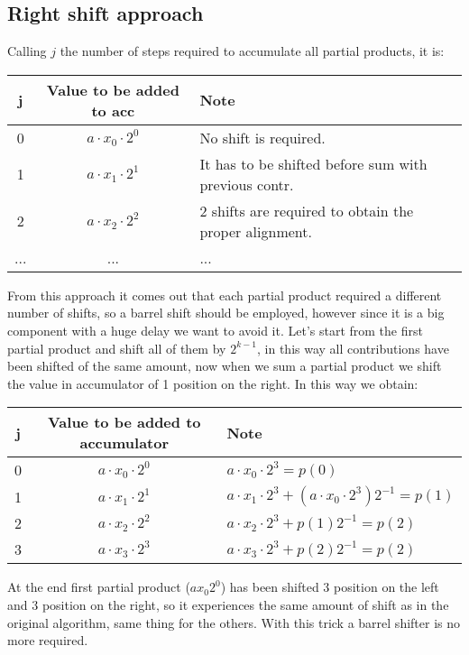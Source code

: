 \subsection{Right shift approach}
Calling $j$ the number of steps required to accumulate all partial products, it is:

\begin{center}
  \begin{tabular}{|c|c|l|}
    \hline
    j&  Value to be added to acc& Note\\
    \hline
    0&    $a \cdot x_0 \cdot 2^0$&  No shift is required.\\
    1&    $a \cdot x_1 \cdot 2^1$&  It has to be shifted before sum with previous contr.\\
    2&    $a \cdot x_2 \cdot 2^2$&  2 shifts are required to obtain the proper alignment.\\
    ...& ...& ...\\
    \hline
  \end{tabular}
\end{center}

From this approach it comes out that each partial product required a different number of shifts, so a barrel shift should be employed, however since it is a big component with a huge delay we want to avoid it. Let's start from the first partial product and shift all of them by $2^{k-1}$, in this way all contributions have been shifted of the same amount, now when we sum a partial product we shift the value in accumulator of 1 position on the right. In this way we obtain:

\begin{center}
  \begin{tabular}{|c|c|l|}
    \hline
    j&  Value to be added to accumulator& Note\\
    \hline
    0&    $a \cdot x_0 \cdot 2^0$& $a \cdot x_0 \cdot 2^3 =p(0) $ \\
    1&    $a \cdot x_1 \cdot 2^1$& $a \cdot x_1 \cdot 2^3 + (a \cdot x_0 \cdot 2^3) 2^{-1} =p(1) $  \\
    2&    $a \cdot x_2 \cdot 2^2$& $a \cdot x_2 \cdot 2^3 + p(1) 2^{-1} =p(2) $\\
    3&    $a \cdot x_3 \cdot 2^3$& $a \cdot x_3 \cdot 2^3 + p(2) 2^{-1} =p(2) $\\
    \hline
  \end{tabular}
\end{center}

At the end first partial product ($a x_0 2^0$) has been shifted 3 position on the left and 3 position on the right, so it experiences the same amount of shift as in the original algorithm, same thing for the others. With this trick a barrel shifter is no more required.\\


